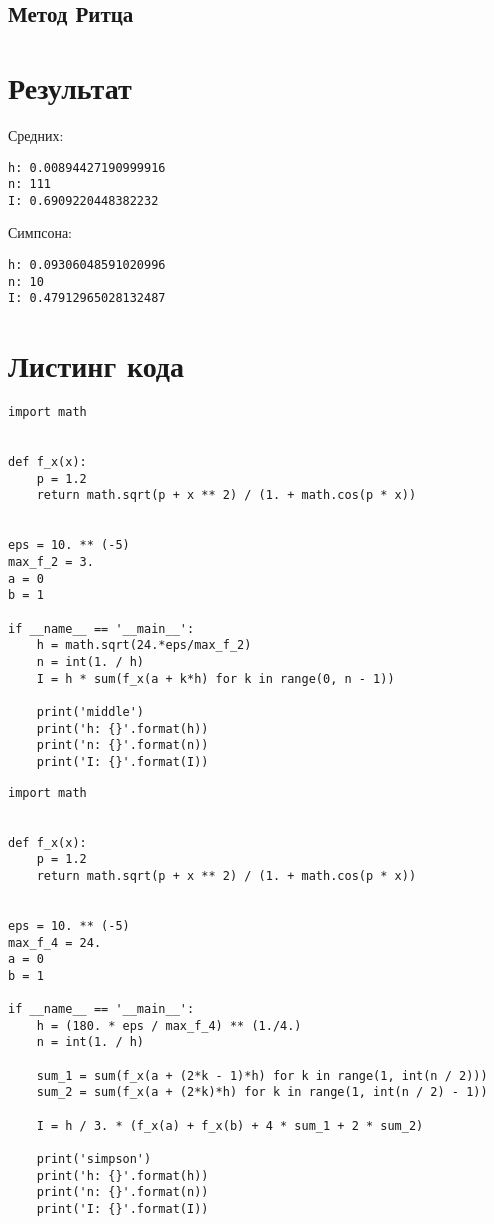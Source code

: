 \documentclass[12pt]{article}
\makeatletter
\newcommand{\verbatimfont}[1]{\renewcommand{\verbatim@font}{\ttfamily#1}}
\makeatother
\begin{document}
	\subsection*{Метод Ритца}
	
\section*{Результат}
Средних:
\verbatimfont{\small}
\begin{verbatim}
h: 0.00894427190999916
n: 111
I: 0.6909220448382232
\end{verbatim}
Симпсона:
\verbatimfont{\small}
\begin{verbatim}
h: 0.09306048591020996
n: 10
I: 0.47912965028132487
\end{verbatim}
\newpage
\section{Листинг кода}
\verbatimfont{\small}
\begin{verbatim}
import math


def f_x(x):
    p = 1.2
    return math.sqrt(p + x ** 2) / (1. + math.cos(p * x))


eps = 10. ** (-5)
max_f_2 = 3.
a = 0
b = 1

if __name__ == '__main__':
    h = math.sqrt(24.*eps/max_f_2)
    n = int(1. / h)
    I = h * sum(f_x(a + k*h) for k in range(0, n - 1))

    print('middle')
    print('h: {}'.format(h))
    print('n: {}'.format(n))
    print('I: {}'.format(I))
\end{verbatim}
\newpage
\verbatimfont{\small}
\begin{verbatim}
import math


def f_x(x):
    p = 1.2
    return math.sqrt(p + x ** 2) / (1. + math.cos(p * x))


eps = 10. ** (-5)
max_f_4 = 24.
a = 0
b = 1

if __name__ == '__main__':
    h = (180. * eps / max_f_4) ** (1./4.)
    n = int(1. / h)

    sum_1 = sum(f_x(a + (2*k - 1)*h) for k in range(1, int(n / 2)))
    sum_2 = sum(f_x(a + (2*k)*h) for k in range(1, int(n / 2) - 1))

    I = h / 3. * (f_x(a) + f_x(b) + 4 * sum_1 + 2 * sum_2)

    print('simpson')
    print('h: {}'.format(h))
    print('n: {}'.format(n))
    print('I: {}'.format(I))
\end{verbatim}
\end{document}
